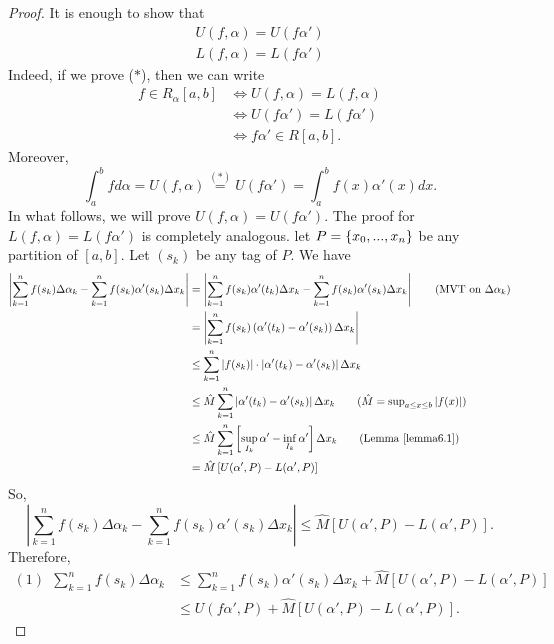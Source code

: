 \begin{proof}
    It is enough to show that
    \begin{align*}
        U(f, \alpha) = U(f\alpha') \tag{$*$} \\
        L(f, \alpha) = L(f\alpha')
    \end{align*}
    Indeed, if we prove ($*$), then we can write
    \begin{align*}
        f\in R_\alpha[a,b] &\iff U(f, \alpha) = L(f, \alpha) \\
        &\iff U(f\alpha') = L(f\alpha') \\
        &\iff f\alpha' \in R[a,b].
    \end{align*}
    Moreover,
    $$\int_a^bfd\alpha = U(f, \alpha) \overset{(*)}{=} U(f\alpha') = \int_a^b f(x) \alpha'(x)dx.$$
    In what follows, we will prove $U(f,\alpha) = U(f\alpha')$. The proof for $L(f,\alpha) = L(f\alpha')$ is completely analogous. let $P = \left\{x_0, ..., x_n\right\}$ be any partition of $[a,b]$. Let $(s_k)$ be any tag of $P$. We have
    \begin{align*}
        \left|\sum_{k=1}^{n}f(s_k)\Delta \alpha_k - \sum_{k=1}^{n}f(s_k)\alpha'(s_k) \Delta x_k\right| &= \left|\sum_{k=1}^{n}f(s_k)\alpha'(t_k)\Delta x_k - \sum_{k=1}^{n}f(s_k)\alpha'(s_k) \Delta x_k\right| \tag{MVT on $\Delta\alpha_k$} \\
        &= \left|\sum_{k=1}^{n}f(s_k) \left(\alpha'(t_k) - \alpha'(s_k)\right)\Delta x_k\right| \\ 
        &\leq \sum_{k=1}^{n}|f(s_k)| \cdot \left|\alpha'(t_k) - \alpha'(s_k)\right| \Delta x_k \\
        &\leq \hat{M} \sum_{k=1}^{n}\left|\alpha'(t_k) - \alpha'(s_k)\right|\Delta x_k \tag{$\hat{M}=\sup_{a \leq x \leq b}|f(x)|$} \\
        &\leq \hat{M} \sum_{k=1}^{n}\left[\sup_{I_k}\alpha' - \inf_{I_k}\alpha'\right]\Delta x_k \tag{Lemma \ref{lemma6.1}} \\
        &= \hat{M} \left[U(\alpha', P) - L(\alpha', P)\right]
    \end{align*}
    So,
    $$\left|\sum_{k=1}^{n}f(s_k)\Delta \alpha_k - \sum_{k=1}^{n}f(s_k)\alpha'(s_k)\Delta x_k\right| \leq \hat{M}\left[U(\alpha', P)- L(\alpha', P)\right].$$
    Therefore,
    \begin{align*}
        (1)~~ \sum_{k=1}^{n}f(s_k) \Delta \alpha_k &\leq \sum_{k=1}^{n}f(s_k)\alpha'(s_k)\Delta x_k + \hat{M} \left[U(\alpha', P) - L(\alpha', P)\right] \\ 
        &\leq U(f\alpha', P) + \hat{M}\left[U(\alpha', P) - L(\alpha', P)\right].

\end{align*}
\end{proof}
